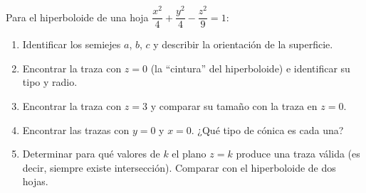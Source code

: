 Para el hiperboloide de una hoja $\dfrac{x^2}{4} + \dfrac{y^2}{4} - \dfrac{z^2}{9} = 1$:
\begin{enumerate}
    \item Identificar los semiejes $a$, $b$, $c$ y describir la orientación de la superficie.
    \item Encontrar la traza con $z = 0$ (la ``cintura'' del hiperboloide) e identificar su tipo y radio.
    \item Encontrar la traza con $z = 3$ y comparar su tamaño con la traza en $z = 0$.
    \item Encontrar las trazas con $y = 0$ y $x = 0$. ¿Qué tipo de cónica es cada una?
    \item Determinar para qué valores de $k$ el plano $z = k$ produce una traza válida (es decir, siempre existe intersección). Comparar con el hiperboloide de dos hojas.
\end{enumerate}